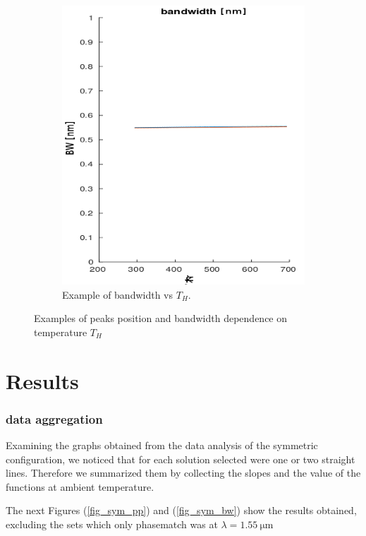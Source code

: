 \documentclass[12pt,a4paper,twoside]{article}
\begin{document}
\begin{figure}[!h]
\begin{subfigure}[b]{0.45\textwidth}
		\includegraphics[width=1\textwidth]{ex_bw.png}
		\caption{Example of bandwidth vs $T_H$.}
		\label{fig_example_bandwidth}
	\end{subfigure}
	\caption{Examples of peaks position and bandwidth dependence on temperature $T_H$}
	\label{fig_examples}
\end{figure}

\section{Results}
\subsubsection{data aggregation}
Examining the graphs obtained from the data analysis of the symmetric configuration, we noticed that for each solution selected were one or two straight lines.
Therefore we summarized them by collecting the slopes and the value of the functions at ambient temperature.

The next Figures (\ref{fig_sym_pp}) and (\ref{fig_sym_bw}) show the results obtained, excluding the sets which only phasematch was at $\lambda = \SI{1.55}{\um}$
\end{document}
